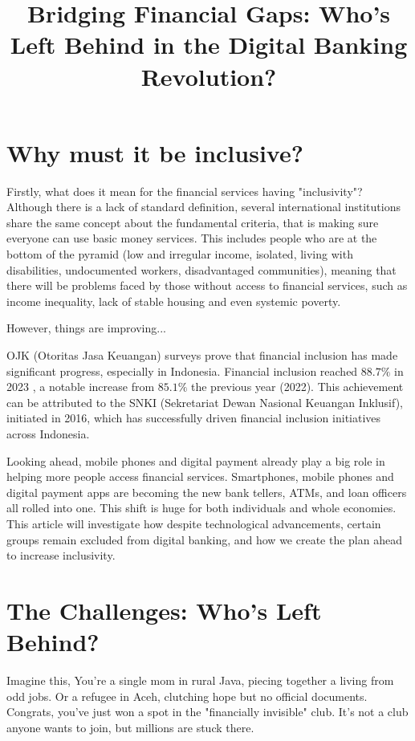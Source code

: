 \documentclass[10pt]{article}
\title{Bridging Financial Gaps: Who's Left Behind in the Digital Banking Revolution? }
\author{}
\date{}
\begin{document}
\maketitle
\section*{Why must it be inclusive?}
Firstly, what does it mean for the financial services having "inclusivity"? Although there is a lack of standard definition, several international institutions share the same concept about the fundamental criteria, that is making sure everyone can use basic money services. This includes people who are at the bottom of the pyramid (low and irregular income, isolated, living with disabilities, undocumented workers, disadvantaged communities), meaning that there will be problems faced by those without access to financial services, such as income inequality, lack of stable housing and even systemic poverty.

However, things are improving...

OJK (Otoritas Jasa Keuangan) surveys prove that financial inclusion has made significant progress, especially in Indonesia. Financial inclusion reached $88.7 \%$ in 2023 , a notable increase from $85.1 \%$ the previous year (2022). This achievement can be attributed to the SNKI (Sekretariat Dewan Nasional Keuangan Inklusif), initiated in 2016, which has successfully driven financial inclusion initiatives across Indonesia.

Looking ahead, mobile phones and digital payment already play a big role in helping more people access financial services. Smartphones, mobile phones and digital payment apps are becoming the new bank tellers, ATMs, and loan officers all rolled into one. This shift is huge for both individuals and whole economies. This article will investigate how despite technological advancements, certain groups remain excluded from digital banking, and how we create the plan ahead to increase inclusivity.

\section*{The Challenges: Who's Left Behind?}
Imagine this, You're a single mom in rural Java, piecing together a living from odd jobs. Or a refugee in Aceh, clutching hope but no official documents. Congrats, you've just won a spot in the "financially invisible" club. It's not a club anyone wants to join, but millions are stuck there.
\end{document}
